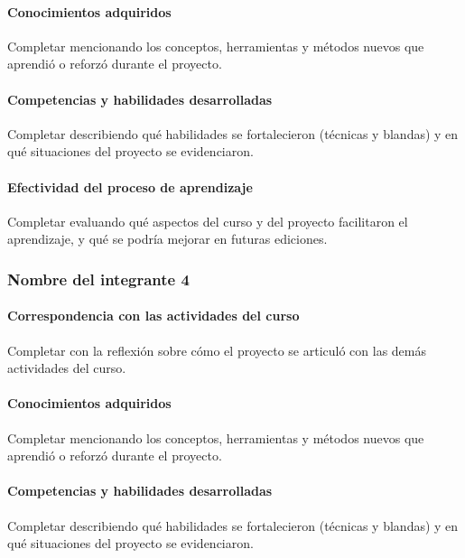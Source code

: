 \documentclass[11pt,a4paper]{article}
\begin{document}
\paragraph{Conocimientos adquiridos}

Completar mencionando los conceptos, herramientas y métodos nuevos que
aprendió o reforzó durante el proyecto.

\paragraph{Competencias y habilidades desarrolladas}

Completar describiendo qué habilidades se fortalecieron (técnicas y blandas)
y en qué situaciones del proyecto se evidenciaron.

\paragraph{Efectividad del proceso de aprendizaje}

Completar evaluando qué aspectos del curso y del proyecto facilitaron el
aprendizaje, y qué se podría mejorar en futuras ediciones.

\subsubsection*{Nombre del integrante 4}


\paragraph{Correspondencia con las actividades del curso}

Completar con la reflexión sobre cómo el proyecto se articuló con las demás
actividades del curso.

\paragraph{Conocimientos adquiridos}

Completar mencionando los conceptos, herramientas y métodos nuevos que
aprendió o reforzó durante el proyecto.

\paragraph{Competencias y habilidades desarrolladas}

Completar describiendo qué habilidades se fortalecieron (técnicas y blandas)
y en qué situaciones del proyecto se evidenciaron.
\end{document}
